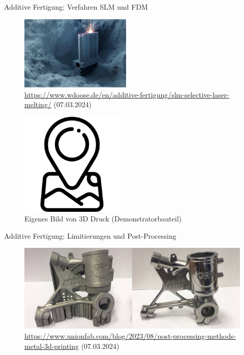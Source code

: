 \documentclass[../slides.tex]{subfiles}
\begin{document}
\begin{frame}{Additive Fertigung: Verfahren SLM und FDM}
  \begin{minipage}[]{0.49\textwidth}
    \begin{figure}[]
      \includegraphics[width=150pt]{img_niklas/csm_h_bearb_LASERTEC_SLM_Blade_Powder_e24c562ac8.jpg}
      \caption{\tiny{\url{https://www.wdoose.de/en/additive-fertigung/slm-selective-laser-melting/} (07.03.2024)}}
      \label{fig:slm}
    \end{figure}
  \end{minipage}
  \begin{minipage}[]{0.49\textwidth}
    \begin{figure}[]
      \includegraphics[height=140pt]{img_niklas/before_clamping.png}
      \caption{Eigenes Bild von 3D Druck (Demonstratorbauteil)}
    \end{figure}
  \end{minipage}
\end{frame}

\begin{frame}{Additive Fertigung: Limitierungen und Post-Processing}
  \begin{minipage}[t]{\textwidth}
    \begin{figure}[]
      \includegraphics[width=\textwidth]{img_niklas/image-32-1024x384.png}
      \caption{\tiny{\url{https://www.unionfab.com/blog/2023/08/post-processing-methods-metal-3d-printing} (07.03.2024)}}
      \label{fig:post_processing}
    \end{figure}
  \end{minipage}
\end{frame}
\end{document}
